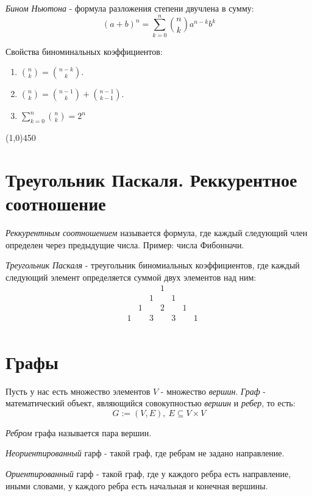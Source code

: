 \documentclass[a4paper,12pt]{article}
\begin{document}
	\textit{Бином Ньютона} - формула разложения степени двучлена в сумму:
	\[
	(a + b)^n = \sum_{k = 0}^{n} {n \choose k} a^{n - k}b^k
	\]

	Свойства биноминальных коэффициентов:
	\begin{enumerate}
		\item ${n \choose k} = {n - k \choose k}$.
		\item ${n \choose k} = {n - 1 \choose k} + {n -1 \choose k - 1}.$
		\item $\sum_{k = 0}^n {n \choose k} = 2 ^ n$
	\end{enumerate}


	\begin{center}
		\line(1,0){450}
	\end{center}

	\section*{Треугольник Паскаля. Реккурентное соотношение}
	\textit{Реккурентным соотношением} называется формула, где каждый следующий член определен через предыдущие числа. Пример: числа Фибонначи.

	\textit{Треугольник Паскаля} - треугольник биномиальных коэффициентов, где каждый следующий элемент определяется суммой двух элементов над ним:
	\[
	\begin{matrix}
			&	&	&	&1	&	&	&	\\
			&	&	&1	&	& 1 & 	&	\\
			&	&1	&	&2	&	&1 	& 	\\
			&1	&	&3	&	&3	& 	&1 	\\

	\end{matrix}
	\]

	\section*{Графы}
	Пусть у нас есть множество элементов $V$ - множество \textit{вершин}.
	\textit{Граф} - математический объект, являющийся совокупностью \textit{вершин} и \textit{ребер}, то есть:
	\[
	G := (V, E), \ E \subseteq V \times V
	\]

	\textit{Ребром} графа называется пара вершин.

	\textit{Неориентированный} гарф - такой граф, где ребрам не задано направление.

	\textit{Ориентированный} гарф - такой граф, где у каждого ребра есть направление, иными словами, у каждого ребра есть начальная и конечная вершины.
\end{document}
